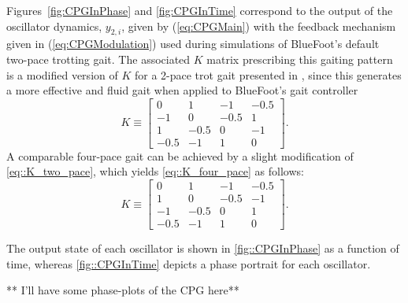 			Figures~\ref{fig:CPGInPhase} and \ref{fig:CPGInTime} correspond to the output of the oscillator dynamics, $y_{2,i}$, given by (\ref{eq:CPGMain}) with the feedback mechanism given in (\ref{eq:CPGModulation})  used during simulations of BlueFoot's default two-pace trotting gait. The associated $K$ matrix prescribing this gaiting pattern is a modified version of $K$ for a 2-pace trot gait presented in \cite{Rutishauser2008}, since this generates a more effective and fluid gait when applied to BlueFoot's gait controller
				\begin{equation}
						K\equiv 
						\left[ 
						\begin{array}{cccc}
						 0	   	&	 1   	&	 	-1   	&		-0.5\\
						-1	   	&	 0   	&	 	-0.5   	&		 1 	\\
						 1    	&	-0.5   	&		0    	&	 	-1 	\\
						-0.5	&	-1   	&		1    	&		 0
						\end{array}
						\right].
						\label{eq::K_two_pace}
				\end{equation}
			A comparable four-pace gait can be achieved by a slight modification of \ref{eq::K_two_pace}, which yields \ref{eq::K_four_pace} as follows:
				\begin{equation}
						K\equiv 
						\left[ 
						\begin{array}{cccc}
						 0	   	&	 1   	&	 	-1   	&		-0.5\\
						 1	   	&	 0   	&	 	-0.5   	&		-1 	\\
						-1    	&	-0.5   	&		0    	&	 	 1 	\\
						-0.5	&	-1   	&		1    	&		 0
						\end{array}
						\right].
						\label{eq::K_four_pace}
				\end{equation}

			The output state of each \Ith oscillator is shown in \ref{fig::CPGInPhase} as a function of time, whereas \ref{fig::CPGInTime} depicts a phase portrait for each \Ith oscillator.  

			** I'll have some phase-plots of the CPG here**

